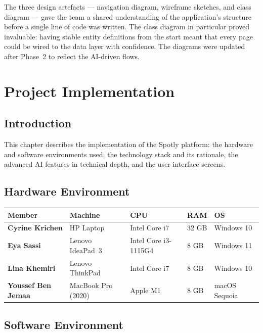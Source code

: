 \documentclass[12pt,a4paper,oneside]{report}
\begin{document}
The three design artefacts --- navigation diagram, wireframe sketches, and
class diagram --- gave the team a shared understanding of the application's
structure before a single line of code was written. The class diagram in
particular proved invaluable: having stable entity definitions from the start
meant that every page could be wired to the data layer with confidence.
The diagrams were updated after Phase~2 to reflect the AI-driven flows.


\chapter{Project Implementation}

\section{Introduction}

This chapter describes the implementation of the Spotly platform: the hardware
and software environments used, the technology stack and its rationale, the
advanced AI features in technical depth, and the user interface screens.

\section{Hardware Environment}

\begin{tabularx}{\linewidth}{>{\bfseries}L{3cm} L{3cm} L{3.5cm} L{1.3cm} L{2.5cm}}
  \toprule
  Member & Machine & CPU & RAM & OS \\
  \midrule
  Cyrine Krichen   & HP Laptop           & Intel Core i7        & 32 GB & Windows 10 \\
  Eya Sassi        & Lenovo IdeaPad~3    & Intel Core i3-1115G4 & 8 GB  & Windows 11 \\
  Lina Khemiri     & Lenovo ThinkPad     & Intel Core i7        & 8 GB  & Windows 10 \\
  Youssef Ben Jemaa & MacBook Pro (2020) & Apple M1             & 8 GB  & macOS Sequoia \\
  \bottomrule
\end{tabularx}

\section{Software Environment}
\end{document}
